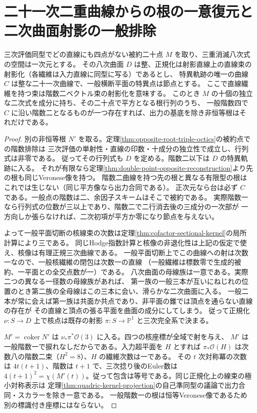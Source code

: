 \section{二十一次二重曲線からの根の一意復元と二次曲面射影の一般排除}
\label{sec:quadric-ruling-identifiability}
\begin{theorem}\label{thm:intrinsic-secant-scroll-root}
三次評価同型でどの直線にも四点がない被約二十点 $M$ を取り、三重消滅八次式の空間は一次元とする。
その八次曲面 $D$ は整、正規化は射影直線上の直線束の射影化（各繊維は入力直線に同型に写る）であるとし、
特異軌跡の唯一の曲線 $C$ は整な二十一次曲線で、一般横断平面の特異点は節点とする。
ここで直線繊維を持つ束は階数二ベクトル束の射影化を意味する。
このとき $M$ の十個の独立な二次式を成分に持ち、その二十点で平方となる根行列のうち、
一般階数四で $C$ に沿い階数二となるものが一つ存在すれば、出力の基底を除き非恒等根はそれだけである。
\end{theorem}
\begin{proof}
別の非恒等根 $N'$ を取る。定理\ref{thm:opposite-root-triple-octics}の被約点での階数排除は
三次評価の単射性・直線の印数・十成分の独立性で成立し、行列式は非零である。
従ってその行列式も $D$ を定める。階数二以下は $D$ の特異軌跡に入る。
それが有限なら定理\ref{thm:double-point-opposite-reconstruction}より先の根も同じVeronese像を持つ。
階数二曲線を持つ先の根と異なる有限型の根はこれでは生じない（同じ平方像なら出力合同である）。
正次元なら台は必ず $C$ である。一般点の階数は二、余因子スキームはそこで被約である。
実際階数一なら行列式の位数が三以上であり、階数二で二行消去後の三成分の一次部が
一方向しか張らなければ、二次初項が平方か零になり節点を与えない。

よって一般平面切断の核線束の次数は定理\ref{thm:cofactor-sectional-kernel}の局所計算により三である。
同じHodge指数計算と核像の非退化性は上記の仮定で使え、核像は有理正規三次曲線である。
一般平面切断上でこの曲線への射は次数一なので、一般核繊維の閉包は次数一の直線
（一般繊維は標数零で生成的被約、一平面との全交点数が一）である。
八次曲面の母線族は一意である。実際二つの異なる一径数の母線族があれば、
第一族の一般三本が互いにねじれの位置のとき第二族の全母線はこの三本に会い、滑らかな二次曲面に入る。
一般二本が常に会えば第一族は共面か共点であり、非平面の錐では頂点を通らない直線の存在が
その直線と頂点の張る平面を曲面の成分にしてしまう。
従って正規化 $\nu:S\to D$ 上で核点は既存の射影 $\pi:S\to\mathbb P^1$ と三次完全系で決まる。

$M'=\operatorname{coker}N'$ は $\nu_*\pi^*\mathcal O(3)$ に入る。四つの核座標が全域で射を与え、
$M'$ は一般階数一で捩れなしだからである。入力超平面を $H$ とすれば
$\pi_*\mathcal O(H)$ は次数八の階数二束（$H^2=8$）、$H$ の繊維次数は一である。
その $t$ 次対称冪の次数は $4t(t+1)$、階数は $t+1$ で、三次捻り後のEuler数は
$4(t+1)^2=\chi(M'(t))$。従って包含は等号である。同じ正規化上の線束の極小対称表示は
定理\ref{thm:quadric-kernel-projection}の自己準同型の議論で出力合同・スカラーを除き一意である。
一般階数一の根は恒等Veronese像であるため別の標識付き座標にはならない。
\end{proof}

